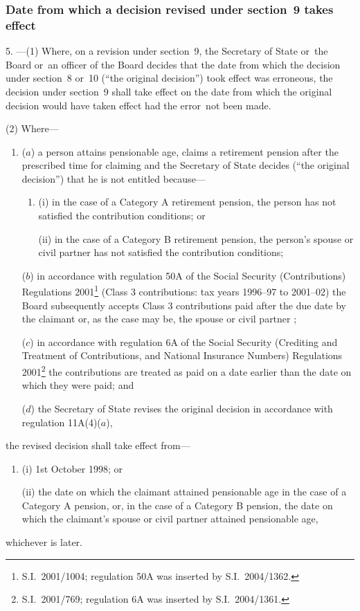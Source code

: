 \documentclass[12pt,a4paper]{article}
\begin{document}
\subsubsection[5. Date from which a decision revised under section~9 takes effect]{Date from which a decision revised under section~9 takes effect}

5.%
---(1)  %
  Where, on a revision under section~9, the Secretary of State
or~the Board or~an officer of the Board  %
decides that the date from which the decision under section~8 or~10 (“the original decision”) took effect was erroneous, the decision under section~9 shall take effect on the date from which the original decision would have taken effect had the error~not been made.

(2) Where—
\begin{enumerate}\item[]
($a$) a person attains pensionable age, claims a retirement pension after the prescribed time for claiming and the Secretary of State decides (“the original decision”) that he is not entitled because—
\begin{enumerate}\item[]
(i) in the case of a Category A retirement pension, the person has not satisfied the contribution conditions; or

(ii) in the case of a Category B retirement pension, the person’s spouse 
or civil partner  %
has not satisfied the contribution conditions;
\end{enumerate}

($b$) in accordance with regulation 50A of the Social Security (Contributions) Regulations 2001\footnote{S.I.~2001/1004; regulation 50A was inserted by S.I.~2004/1362.} (Class 3 contributions: tax years 1996--97 to 2001--02) the Board subsequently accepts Class 3 contributions paid after the due date by the claimant or, as the case may be, the spouse
or civil partner%
;

($c$) in accordance with regulation 6A of the Social Security (Crediting and Treatment of Contributions, and National Insurance Numbers) Regulations 2001\footnote{S.I.~2001/769; regulation 6A was inserted by S.I.~2004/1361.} the contributions are treated as paid on a date earlier than the date on which they were paid; and

($d$) the Secretary of State revises the original decision in accordance with regulation 11A(4)($a$),
\end{enumerate}
the revised decision shall take effect from—
\begin{enumerate}\item[]
(i) 1st October 1998; or

(ii) the date on which the claimant attained pensionable age in the case of a Category A pension, or, in the case of a Category B pension, the date on which the claimant’s spouse or civil partner  %
attained pensionable age,
\end{enumerate}
whichever is later.
\end{document}
